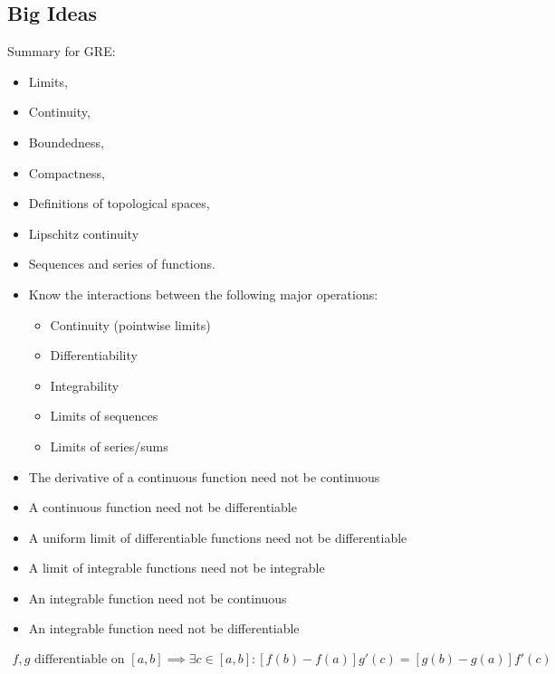 \hypertarget{big-ideas}{%
\subsection{Big Ideas}\label{big-ideas}}

Summary for GRE:

\begin{itemize}
\item
  Limits,
\item
  Continuity,
\item
  Boundedness,
\item
  Compactness,
\item
  Definitions of topological spaces,
\item
  Lipschitz continuity
\item
  Sequences and series of functions.
\item
  Know the interactions between the following major operations:

  \begin{itemize}
  \tightlist
  \item
    Continuity (pointwise limits)
  \item
    Differentiability
  \item
    Integrability
  \item
    Limits of sequences
  \item
    Limits of series/sums
  \end{itemize}
\item
  The derivative of a continuous function need not be continuous
\item
  A continuous function need not be differentiable
\item
  A uniform limit of differentiable functions need not be differentiable
\item
  A limit of integrable functions need not be integrable
\item
  An integrable function need not be continuous
\item
  An integrable function need not be differentiable
\end{itemize}

\begin{theorem}

\begin{align*}
f,g\text{ differentiable on } [a,b] \implies \exists c\in[a,b] :
\left[f ( b ) - f ( a ) \right] g' ( c ) = \left[g ( b ) - g ( a )\right] f' ( c )
\end{align*}

\end{theorem}

